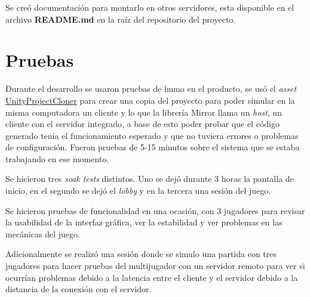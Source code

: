 Se creó documentación para montarlo en otros servidores, esta disponible en el archivo \textbf{README.md} en la raíz del repositorio del proyecto.

\section{Pruebas}
Durante el desarrollo se usaron pruebas de humo en el producto, se usó el \textit{asset} \href{https://github.com/hwaet/UnityProjectCloner}{UnityProjectCloner} para crear una copia del proyecto para poder simular en la misma computadora un cliente y lo que la librería Mirror llama un \textit{host}, un cliente con el servidor integrado, a base de esto poder probar que el código generado tenía el funcionamiento esperado y que no tuviera errores o problemas de configuración. Fueron pruebas de 5-15 minutos sobre el sistema que se estaba trabajando en ese momento.

Se hicieron tres \textit{soak tests} distintos. Uno se dejó durante 3 horas la pantalla de inicio, en el segundo se dejó el \textit{lobby} y en la tercera una sesión del juego.

Se hicieron pruebas de funcionalidad en una ocasión, con 3 jugadores para revisar la usabilidad de la interfaz gráfica, ver la estabilidad y ver problemas en las mecánicas del juego.

Adicionalmente se realizó una sesión donde se simulo una partida con tres jugadores para hacer pruebas del multijugador con un servidor remoto para ver si ocurrían problemas debido a la latencia entre el cliente y el servidor debido a la distancia de la conexión con el servidor.
